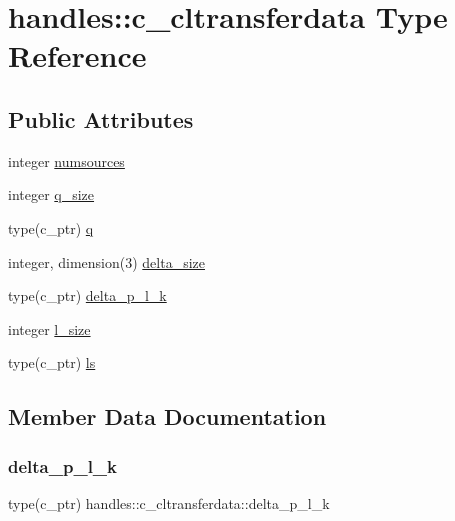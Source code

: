 \hypertarget{structhandles_1_1c__cltransferdata}{}\section{handles\+:\+:c\+\_\+cltransferdata Type Reference}
\label{structhandles_1_1c__cltransferdata}
\subsection*{Public Attributes}
\begin{DoxyCompactItemize}
\item 
integer \mbox{\hyperlink{structhandles_1_1c__cltransferdata_a52e77865878f698640172f639201d1c2}{numsources}}
\item 
integer \mbox{\hyperlink{structhandles_1_1c__cltransferdata_aa9eafa9668aca9d77fbbac65dd985de6}{q\+\_\+size}}
\item 
type(c\+\_\+ptr) \mbox{\hyperlink{structhandles_1_1c__cltransferdata_ad00d3ad0c5a466e00e417ca9545eeae5}{q}}
\item 
integer, dimension(3) \mbox{\hyperlink{structhandles_1_1c__cltransferdata_a8fd96a6f30f5cb45427d6842b8f05f7d}{delta\+\_\+size}}
\item 
type(c\+\_\+ptr) \mbox{\hyperlink{structhandles_1_1c__cltransferdata_a157e64dc91f3486821ea08e992bd6eb6}{delta\+\_\+p\+\_\+l\+\_\+k}}
\item 
integer \mbox{\hyperlink{structhandles_1_1c__cltransferdata_a23b2614c54337484c0fd113c2fc2c1ed}{l\+\_\+size}}
\item 
type(c\+\_\+ptr) \mbox{\hyperlink{structhandles_1_1c__cltransferdata_a5aed726ed8e6eae6d975dd60988628cf}{ls}}
\end{DoxyCompactItemize}


\subsection{Member Data Documentation}
\mbox{\label{structhandles_1_1c__cltransferdata_a157e64dc91f3486821ea08e992bd6eb6}} 
\subsubsection{\texorpdfstring{delta\+\_\+p\+\_\+l\+\_\+k}{delta\_p\_l\_k}}
{\footnotesize\ttfamily type(c\+\_\+ptr) handles\+::c\+\_\+cltransferdata\+::delta\+\_\+p\+\_\+l\+\_\+k}

